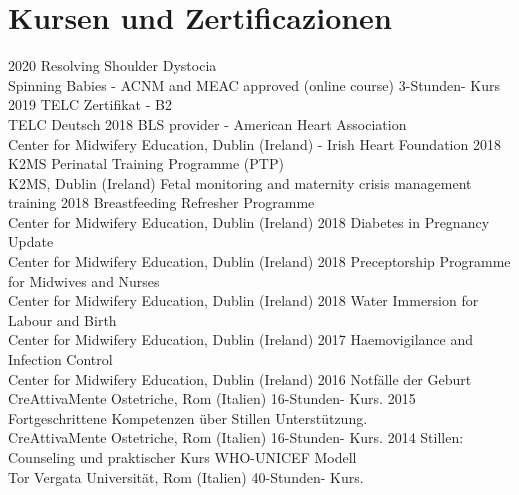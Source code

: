 \documentclass[11pt]{friggeri-cv}
\begin{document}
\section{Kursen und Zertificazionen}
\begin{entrylist}
  \entry
    {2020}
    {Resolving Shoulder Dystocia}
    {\\Spinning Babies - ACNM and MEAC approved (online course)}
    {3-Stunden- Kurs}
  \entry
    {2019}
    {TELC Zertifikat - B2}
    {\\TELC Deutsch}
    {\vspace{-10pt}}
  \entry
    {2018}
    {BLS provider - American Heart Association}
    {\\Center for Midwifery Education, Dublin (Ireland) - Irish Heart Foundation}
    {\vspace{-10pt}}
  \entry
    {2018}
    {K2MS Perinatal Training Programme (PTP)}
    {\\K2MS, Dublin (Ireland)}
    {Fetal monitoring and maternity crisis management training}
  \entry
    {2018}
    {Breastfeeding Refresher Programme}
    {\\Center for Midwifery Education, Dublin (Ireland)}
    {\vspace{-10pt}}
  \entry
    {2018}
    {Diabetes in Pregnancy Update}
    {\\Center for Midwifery Education, Dublin (Ireland)}
    {\vspace{-10pt}}
  \entry
    {2018}
    {Preceptorship Programme for Midwives and Nurses}
    {\\Center for Midwifery Education, Dublin (Ireland)}
    {\vspace{-10pt}}
  \entry
    {2018}
    {Water Immersion for Labour and Birth}
    {\\Center for Midwifery Education, Dublin (Ireland)}
    {\vspace{-10pt}}
  \entry
    {2017}
    {Haemovigilance and Infection Control}
    {\\Center for Midwifery Education, Dublin (Ireland)}
    {\vspace{-10pt}}
  \entry
    {2016}
    {Notf\"{a}lle der Geburt}
    {\\CreAttivaMente Ostetriche, Rom (Italien)}
    {16-Stunden- Kurs.}
  \entry
    {2015}
    {Fortgeschrittene Kompetenzen \"{u}ber Stillen Unterst\"{u}tzung.}
    {\\CreAttivaMente Ostetriche, Rom (Italien)}
    {16-Stunden- Kurs.}
  \entry
    {2014}
    {Stillen: Counseling und praktischer Kurs WHO-UNICEF Modell}
    {\\Tor Vergata Universit\"{a}t, Rom (Italien)}
    {40-Stunden- Kurs.}
\end{entrylist}
\end{document}

